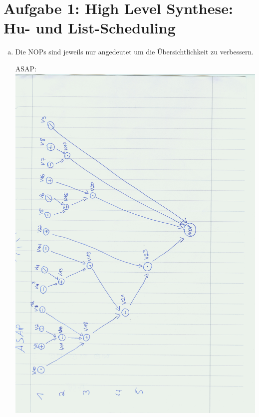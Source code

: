 \documentclass[a4paper]{scrartcl}
\begin{document}
	
\section*{Aufgabe 1: High Level Synthese: Hu- und List-Scheduling}

\begin{enumerate}[(a)]
	\item Die NOPs sind jeweils nur angedeutet um die Übersichtlichkeit zu verbessern.
	
	ASAP:\\	
	\includegraphics[scale=0.5, angle = -90]{Image124}
	

\end{enumerate}
\end{document}
